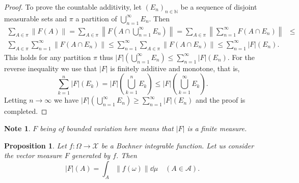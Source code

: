 \documentclass[a4paper, 12pt]{article}
\newtheorem{state}[lem]{Proposition}
\newtheorem{note}[lem]{Note}
\begin{document}
\begin{proof}
To prove the countable additivity, let $(E_n)_{n \in \mathbb{N}}$ be a sequence of disjoint measurable sets and $\pi$ a partition of $\bigcup^{\infty}_{n=1} E_n$. Then
\begin{align*}
\sum_{A \in \pi} \| F(A) \| = \sum_{A \in \pi} \left \| F \left (A \cap \bigcup^{\infty}_{n=1} E_n \right ) \right \| =
\sum_{A \in \pi} \left \| \sum^{\infty}_{n=1} F(A \cap E_n) \right \| &\leqslant \\
\sum_{A \in \pi} \sum^{\infty}_{n=1} \| F(A \cap E_n)  \| \leqslant
\sum^{\infty}_{n=1} \sum_{A \in \pi} \| F(A \cap E_n)  \| \leqslant \sum^{\infty}_{n=1} |F|(E_n).
\end{align*}
This holds for any partition $\pi$ thus $|F|(\bigcup^{\infty}_{n=1} E_n) \leqslant \sum^{\infty}_{n=1} |F|(E_n)$.
For the reverse inequality we use that $|F|$ is finitely additive and monotone, that is, 
$$\sum^{n}_{k=1}|F|(E_k) = |F|\left(\bigcup^{n}_{k=1} E_k \right) \leqslant |F|\left(\bigcup^{\infty}_{k=1} E_k \right).$$
Letting $n \to \infty$ we have $|F|(\bigcup^{\infty}_{n=1} E_n) \geqslant \sum^{\infty}_{n=1} |F|(E_n)$ and the proof is completed.
\end{proof}
\begin{note}\normalfont $F$ being of bounded variation here means that $|F|$ is a finite measure.
\end{note}
\begin{state}\label{prop:variation-norm-integral} Let $f\colon \Omega \to \mathcal{X}$ be a Bochner integrable function. Let us consider the vector measure $F$ generated by $f$. Then
$$|F|(A) = \int_{A} \|f(\omega)\| \dd{\mu} \quad (A \in \mathcal{A}).$$
\end{state}
\end{document}
